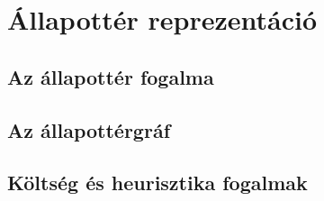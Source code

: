 \section{Állapottér reprezentáció}

\subsection{Az állapottér fogalma}

\subsection{Az állapottérgráf}

\subsection{Költség és heurisztika fogalmak}
